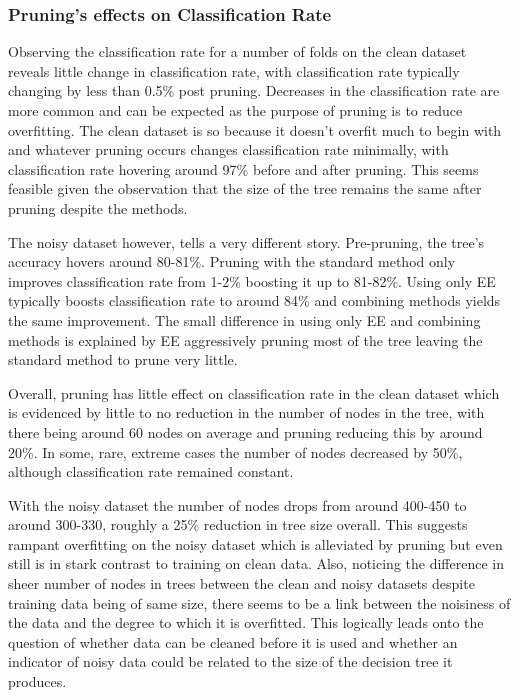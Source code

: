 \documentclass{article}
\begin{document}
\subsubsection{Pruning's effects on Classification Rate}

Observing the classification rate for a number of folds on the clean dataset reveals little change in classification rate, with classification rate typically changing by less than 0.5\% post pruning. Decreases in the classification rate are more common and can be expected as the purpose of pruning is to reduce overfitting. The clean dataset is so because it doesn't overfit much to begin with and whatever pruning occurs changes classification rate minimally, with classification rate hovering around 97\% before and after pruning. This seems feasible given the observation that the size of the tree remains the same after pruning despite the methods.

The noisy dataset however, tells a very different story. Pre-pruning, the tree's accuracy hovers around 80-81\%. Pruning with the standard method only improves classification rate from 1-2\% boosting it up to 81-82\%. Using only EE typically boosts classification rate to around 84\% and combining methods yields the same improvement. The small difference in using only EE and combining methods is explained by EE aggressively pruning most of the tree leaving the standard method to prune very little.

Overall, pruning has little effect on classification rate in the clean dataset which is evidenced by little to no reduction in the number of nodes in the tree, with there being around 60 nodes on average and pruning reducing this by around 20\%. In some, rare, extreme cases the number of nodes decreased by 50\%, although classification rate remained constant.

With the noisy dataset the number of nodes drops from around 400-450 to around 300-330, roughly a 25\% reduction in tree size overall. This suggests rampant overfitting on the noisy dataset which is alleviated by pruning but even still is in stark contrast to training on clean data. Also, noticing the difference in sheer number of nodes in trees between the clean and noisy datasets despite training data being of same size, there seems to be a link between the noisiness of the data and the degree to which it is overfitted. This logically leads onto the question of whether data can be cleaned before it is used and whether an indicator of noisy data could be related to the size of the decision tree it produces.
\end{document}
